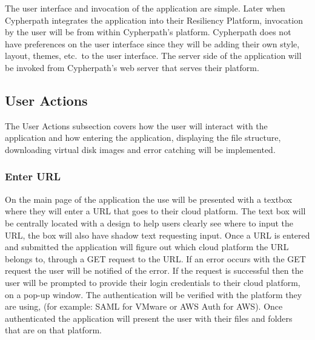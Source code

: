 \documentclass{article}
\begin{document}
        The user interface and invocation of the application are simple. Later when Cypherpath integrates the application into their Resiliency Platform, invocation by the user will be from within Cypherpath's
        platform. Cypherpath does not have preferences on the user interface since they will be adding their own style, layout, themes, etc.\ to the user interface. The server side of the application will be invoked
        from Cypherpath's web server that serves their platform.


        \subsection{User Actions}
        The User Actions subsection covers how the user will interact with the application and how entering the application, displaying the file structure, downloading virtual disk images and error catching 
        will be implemented.

            \subsubsection{Enter URL}
            On the main page of the application the use will be presented with a textbox where they will enter a URL that goes to their cloud platform. The text box will be centrally located with a design to
            help users clearly see where to input the URL, the box will also have shadow text requesting input. Once a URL is entered and submitted the application will figure out which cloud platform the URL
            belongs to, through a GET request to the URL. If an error occurs with the GET request the user will be notified of the error. If the request is successful then the user will be prompted to
            provide their login credentials to their cloud platform, on a pop-up window. The authentication will be verified with the platform they are using, (for example: SAML for VMware or AWS Auth for AWS).
            Once authenticated the application will present the user with their files and folders that are on that platform.
            
\end{document}
